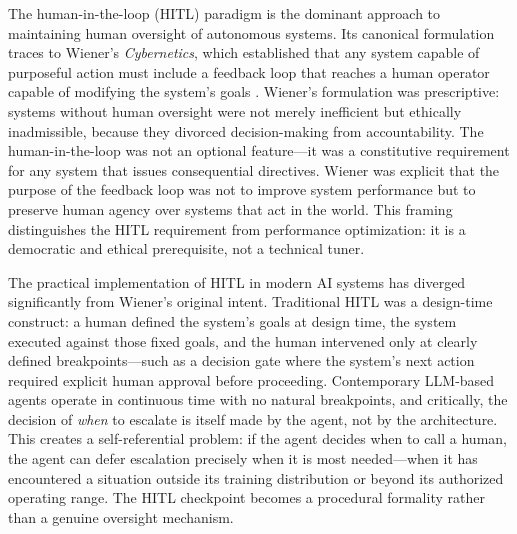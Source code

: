 The human-in-the-loop (HITL) paradigm is the dominant approach to maintaining human oversight of autonomous systems. Its canonical formulation traces to Wiener's \emph{Cybernetics}, which established that any system capable of purposeful action must include a feedback loop that reaches a human operator capable of modifying the system's goals \cite{wiener1948}. Wiener's formulation was prescriptive: systems without human oversight were not merely inefficient but ethically inadmissible, because they divorced decision-making from accountability. The human-in-the-loop was not an optional feature---it was a constitutive requirement for any system that issues consequential directives. Wiener was explicit that the purpose of the feedback loop was not to improve system performance but to preserve human agency over systems that act in the world. This framing distinguishes the HITL requirement from performance optimization: it is a democratic and ethical prerequisite, not a technical tuner.

The practical implementation of HITL in modern AI systems has diverged significantly from Wiener's original intent. Traditional HITL was a design-time construct: a human defined the system's goals at design time, the system executed against those fixed goals, and the human intervened only at clearly defined breakpoints---such as a decision gate where the system's next action required explicit human approval before proceeding. Contemporary LLM-based agents operate in continuous time with no natural breakpoints, and critically, the decision of \emph{when} to escalate is itself made by the agent, not by the architecture. This creates a self-referential problem: if the agent decides when to call a human, the agent can defer escalation precisely when it is most needed---when it has encountered a situation outside its training distribution or beyond its authorized operating range. The HITL checkpoint becomes a procedural formality rather than a genuine oversight mechanism.

